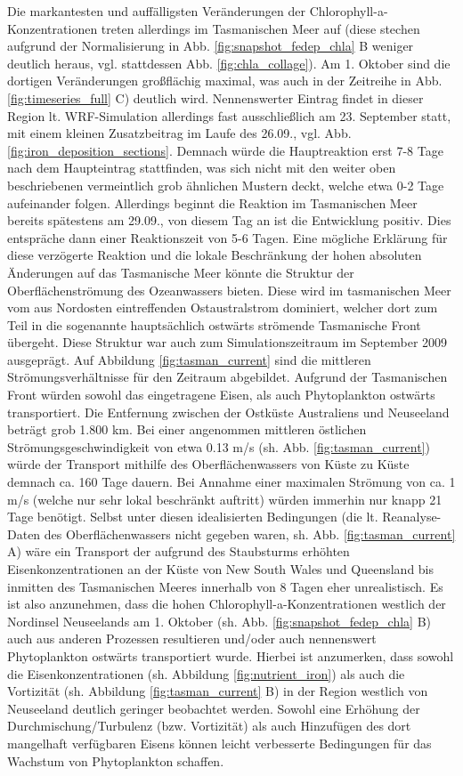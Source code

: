 \documentclass[12pt,a4paper,onecolumn]{scrartcl}
\begin{document}
Die markantesten und auffälligsten Veränderungen der Chlorophyll-a-Konzentrationen treten allerdings im Tasmanischen Meer auf (diese stechen aufgrund der Normalisierung in Abb. \ref{fig:snapshot_fedep_chla} B weniger deutlich heraus, vgl. stattdessen Abb. \ref{fig:chla_collage}). Am 1. Oktober sind die dortigen Veränderungen großflächig maximal, was auch in der Zeitreihe in Abb. \ref{fig:timeseries_full} C) deutlich wird. Nennenswerter Eintrag findet in dieser Region lt. WRF-Simulation allerdings fast ausschließlich am 23. September statt, mit einem kleinen Zusatzbeitrag im Laufe des 26.09., vgl. Abb. \ref{fig:iron_deposition_sections}. Demnach würde die Hauptreaktion erst 7-8 Tage nach dem Haupteintrag stattfinden, was sich nicht mit den weiter oben beschriebenen vermeintlich grob ähnlichen Mustern deckt, welche etwa 0-2 Tage aufeinander folgen. Allerdings beginnt die Reaktion im Tasmanischen Meer bereits spätestens am 29.09., von diesem Tag an ist die Entwicklung positiv. Dies entspräche dann einer Reaktionszeit von 5-6 Tagen. Eine mögliche Erklärung für diese verzögerte Reaktion und die lokale Beschränkung der hohen absoluten Änderungen auf das Tasmanische Meer könnte die Struktur der Oberflächenströmung des Ozeanwassers bieten. Diese wird im tasmanischen Meer vom aus Nordosten eintreffenden Ostaustralstrom dominiert, welcher dort zum Teil in die sogenannte hauptsächlich ostwärts strömende Tasmanische Front übergeht. Diese Struktur war auch zum Simulationszeitraum im September 2009 ausgeprägt. Auf Abbildung \ref{fig:tasman_current} sind die mittleren Strömungsverhältnisse für den Zeitraum abgebildet. Aufgrund der Tasmanischen Front würden sowohl das eingetragene Eisen, als auch Phytoplankton ostwärts transportiert. Die Entfernung zwischen der Ostküste Australiens und Neuseeland beträgt grob 1.800 km. Bei einer angenommen mittleren östlichen Strömungsgeschwindigkeit von etwa 0.13 m/s (sh. Abb. \ref{fig:tasman_current}) würde der Transport mithilfe des Oberflächenwassers von Küste zu Küste demnach ca. 160 Tage dauern. Bei Annahme einer maximalen Strömung von ca. 1 m/s (welche nur sehr lokal beschränkt auftritt) würden immerhin nur knapp 21 Tage benötigt. Selbst unter diesen idealisierten Bedingungen (die lt. Reanalyse-Daten des Oberflächenwassers nicht gegeben waren, sh. Abb. \ref{fig:tasman_current} A) wäre ein Transport der aufgrund des Staubsturms erhöhten Eisenkonzentrationen an der Küste von New South Wales und Queensland bis inmitten des Tasmanischen Meeres innerhalb von 8 Tagen eher unrealistisch. Es ist also anzunehmen, dass die hohen Chlorophyll-a-Konzentrationen westlich der Nordinsel Neuseelands am 1. Oktober (sh. Abb. \ref{fig:snapshot_fedep_chla} B) auch aus anderen Prozessen resultieren und/oder auch nennenswert Phytoplankton ostwärts transportiert wurde. Hierbei ist anzumerken, dass sowohl die Eisenkonzentrationen (sh. Abbildung \ref{fig:nutrient_iron}) als auch die Vortizität (sh. Abbildung \ref{fig:tasman_current} B) in der Region westlich von Neuseeland deutlich geringer beobachtet werden. Sowohl eine Erhöhung der Durchmischung/Turbulenz (bzw. Vortizität) als auch Hinzufügen des dort mangelhaft verfügbaren Eisens können leicht verbesserte Bedingungen für das Wachstum von Phytoplankton schaffen.
\end{document}
